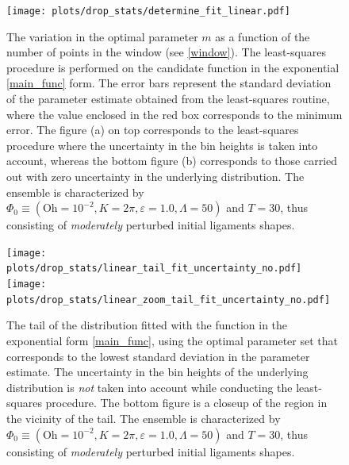 \begin{figure}
\centering
	\texttt{[image: plots/drop\_stats/determine\_fit\_linear.pdf]}
\caption{
	The variation in the optimal parameter $m$ as a 
	function of the number of points in the window (see \ref{window}).
	The least-squares procedure is performed on the 
	candidate function in the exponential \eqref{main_func} form.
	The error bars represent the standard deviation of the 
	parameter estimate obtained from the least-squares routine,
	where the value enclosed in the red box corresponds to the minimum error.
	The figure (a) on top corresponds to the least-squares procedure where the 
	uncertainty in the bin heights is taken into account, whereas the bottom
	figure (b) corresponds to those carried out with zero uncertainty in the underlying distribution. 
	The ensemble is characterized by $\Phi_0 \equiv \left( \textrm{Oh} = 10^{-2}, K = 2\pi 
	, \varepsilon = 1.0 , \Lambda = 50 \right)$ and $T = 30$, 
	thus consisting of \textit{moderately} perturbed initial ligaments shapes. 
	}
\label{determine_linear}
\end{figure}



\begin{figure}
\centering
\texttt{[image: plots/drop\_stats/linear\_tail\_fit\_uncertainty\_no.pdf]} \\
\texttt{[image: plots/drop\_stats/linear\_zoom\_tail\_fit\_uncertainty\_no.pdf]} \\ 
\caption{
	The tail of the distribution fitted with the function 
	in the exponential form \eqref{main_func}, using the optimal parameter
	set that corresponds to the lowest standard deviation in the parameter estimate.
	The uncertainty in the bin heights of the underlying distribution is \textit{not}
	taken into account while conducting the least-squares procedure. 
	The bottom figure is a closeup of the region in the vicinity of the tail.
	The ensemble is characterized by $\Phi_0 \equiv \left( \textrm{Oh} = 10^{-2}, K = 2\pi 
	, \varepsilon = 1.0 , \Lambda = 50 \right)$ and $T = 30$, 
	thus consisting of \textit{moderately} perturbed initial ligaments shapes. 
	}
\label{linear_fits_wo}
\end{figure}


